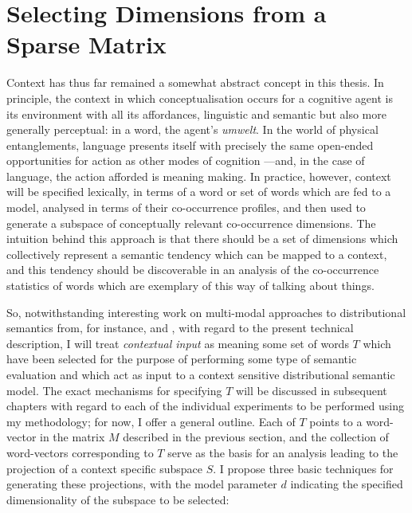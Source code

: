\section{Selecting Dimensions from a Sparse Matrix} \label{sec:project}
Context has thus far remained a somewhat abstract concept in this thesis.  In principle, the context in which conceptualisation occurs for a cognitive agent is its environment with all its affordances, linguistic and semantic but also more generally perceptual: in a word, the agent's \emph{umwelt}.  In the world of physical entanglements, language presents itself with precisely the same open-ended opportunities for action as other modes of cognition \citep{Gibson1979,Clark1997}---and, in the case of language, the action afforded is meaning making.  In practice, however, context will be specified lexically, in terms of a word or set of words which are fed to a model, analysed in terms of their co-occurrence profiles, and then used to generate a subspace of conceptually relevant co-occurrence dimensions.  The intuition behind this approach is that there should be a set of dimensions which collectively represent a semantic tendency which can be mapped to a context, and this tendency should be discoverable in an analysis of the co-occurrence statistics of words which are exemplary of this way of talking about things.


So, notwithstanding interesting work on multi-modal approaches to distributional semantics from, for instance, \cite{HillEA2014} and \cite{BruniEA2014}, with regard to the present technical description, I will treat \emph{contextual input} as meaning some set of words $T$ which have been selected for the purpose of performing some type of semantic evaluation and which act as input to a context sensitive distributional semantic model.  The exact mechanisms for specifying $T$ will be discussed in subsequent chapters with regard to each of the individual experiments to be performed using my methodology; for now, I offer a general outline.  Each   of $T$ points to a word-vector in the matrix $M$ described in the previous section, and the collection of word-vectors corresponding to $T$ serve as the basis for an analysis leading to the projection of a context specific subspace $S$.  I propose three basic techniques for generating these projections, with the model parameter $d$ indicating the specified dimensionality of the subspace to be selected:

